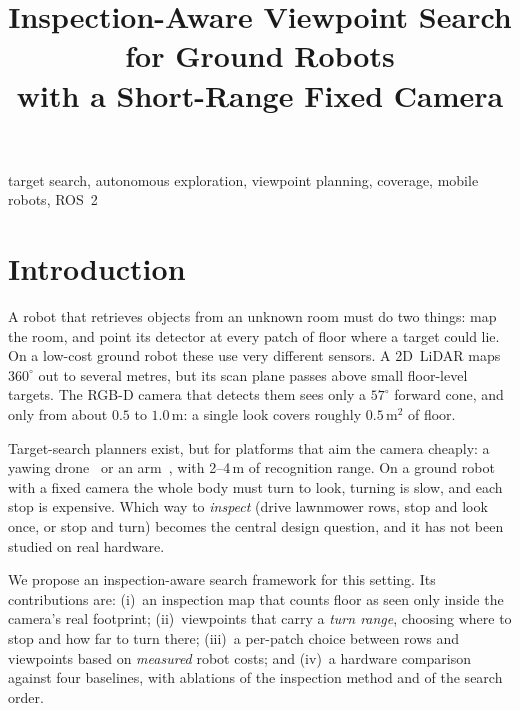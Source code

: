 \documentclass[conference,a4paper,10pt]{IEEEtran}
\begin{document}
\title{Inspection-Aware Viewpoint Search for Ground Robots\\
with a Short-Range Fixed Camera}

\author{
}

\maketitle

\begin{IEEEkeywords}
target search, autonomous exploration, viewpoint planning, coverage,
mobile robots, ROS~2
\end{IEEEkeywords}

\section{Introduction}
A robot that retrieves objects from an unknown room must do two things: map
the room, and point its detector at every patch of floor where a target could
lie. On a low-cost ground robot these use very different sensors. A 2D~LiDAR
maps \(360^{\circ}\) out to several metres, but its scan plane passes above
small floor-level targets. The RGB-D camera that detects them sees only a
\(57^{\circ}\) forward cone, and only from about \(0.5\) to \(1.0\,\mathrm{m}\):
a single look covers roughly \(0.5\,\mathrm{m}^2\) of floor.

Target-search planners exist, but for platforms that aim the camera cheaply:
a yawing drone~\cite{starsearcher} or an arm~\cite{heats}, with 2--4\,m of
recognition range. On a ground robot with a fixed camera the whole body must
turn to look, turning is slow, and each stop is expensive. Which way to
\emph{inspect} (drive lawnmower rows, stop and look once, or stop and turn)
becomes the central design question, and it has not been studied on real
hardware.

We propose an inspection-aware search framework for this setting.
Its contributions are:
(i)~an inspection map that counts floor as seen only inside the camera's real
footprint;
(ii)~viewpoints that carry a \emph{turn range}, choosing where to stop and how
far to turn there;
(iii)~a per-patch choice between rows and viewpoints based on \emph{measured}
robot costs; and
(iv)~a hardware comparison against four baselines, with ablations of the
inspection method and of the search order.
\end{document}
